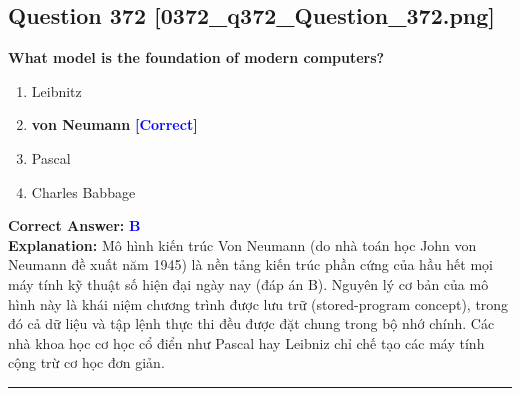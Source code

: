 \documentclass[11pt,a4paper]{article}
\begin{document}
\begin{minipage}{\textwidth}
\subsection*{Question 372 \quad \footnotesize{[0372\_q372\_Question\_372.png]}}
\noindent \textbf{What model is the foundation of modern computers?}

\begin{enumerate}[label=\Alph*.]
    \item Leibnitz
    \item \textbf{von Neumann} \hfill \textcolor{blue}{\textbf{[Correct]}}
    \item Pascal
    \item Charles Babbage
\end{enumerate}

\noindent \textbf{Correct Answer:} \textcolor{blue}{\textbf{B}} \\[2pt]
\noindent \textbf{Explanation:} Mô hình kiến trúc Von Neumann (do nhà toán học John von Neumann đề xuất năm 1945) là nền tảng kiến trúc phần cứng của hầu hết mọi máy tính kỹ thuật số hiện đại ngày nay (đáp án B). Nguyên lý cơ bản của mô hình này là khái niệm chương trình được lưu trữ (stored-program concept), trong đó cả dữ liệu và tập lệnh thực thi đều được đặt chung trong bộ nhớ chính. Các nhà khoa học cơ học cổ điển như Pascal hay Leibniz chỉ chế tạo các máy tính cộng trừ cơ học đơn giản.

\par\vspace{0.3cm}
\hrule
\vspace{0.3cm}
\end{minipage}
\end{document}
